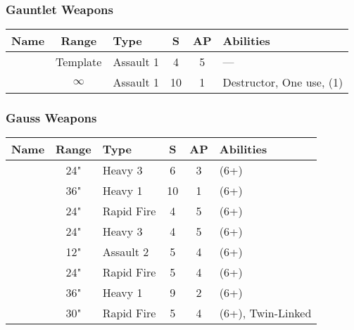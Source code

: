 \subsubsection{Gauntlet Weapons}

\label{Gauntlet of Fire} \label{Tachyon Arrow}
\noindent
\begin{NiceTabularX}{\textwidth}{L{115 pt} c C{40pt} *{2}{c} >{\raggedright\arraybackslash}p{240pt}}
	Name & Range & Type & S & AP & Abilities \\
	\hline
	 & Template & Assault 1 & 4 & 5 & — \\
	  & $\infty$ & Assault 1 & 10 & 1 & Destructor, One use,  (1) \\
\end{NiceTabularX}


\subsubsection{Gauss Weapons}

\label{Gauss Cannon} \label{Gauss Destructor} \label{Gauss Blaster} \label{Gauss Flayer} \label{Gauss Flux Arcs} \label{Gauss Reaper} \label{Heavy Gauss Cannon} \label{Relic Gauss Blaster}
\noindent
\begin{NiceTabular}{L{115 pt} c C{40pt} *{2}{c} >{\raggedright\arraybackslash}p{240pt}}
	Name & Range & Type & S & AP & Abilities \\
	\hline
	 & 24" & Heavy 3 & 6 & 3 &  (6+) \\
	  & 36" & Heavy 1 & 10 & 1 &   (6+) \\
	 & 24" & Rapid Fire & 4 & 5 &  (6+) \\
	  & 24" & Heavy 3 & 4 & 5 &  (6+) \\
	 & 12" & Assault 2 & 5 & 4 &  (6+) \\
	  & 24" & Rapid Fire & 5 & 4 &  (6+) \\
	 & 36" & Heavy 1 & 9 & 2 &  (6+) \\
	 & 30" & Rapid Fire & 5 & 4 &  (6+), Twin-Linked \\	
\end{NiceTabular}

